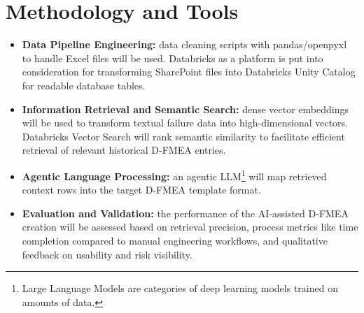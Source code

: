 
\section{Methodology and Tools}

\begin{itemize}
    \item \textbf{Data Pipeline Engineering:} data cleaning scripts with pandas/openpyxl to handle Excel files will be used. Databricks as a platform is put into consideration for transforming SharePoint files into Databricks Unity Catalog for readable database tables.
    \item \textbf{Information Retrieval and Semantic Search:} dense vector embeddings will be used to transform textual failure data into high-dimensional vectors. Databricks Vector Search will rank semantic similarity to facilitate efficient retrieval of relevant historical D-FMEA entries.
    \item \textbf{Agentic Language Processing:} an agentic LLM\footnote{Large Language Models are categories of deep learning models trained on amounts of data.} will map retrieved context rows into the target D-FMEA template format.
    \item \textbf{Evaluation and Validation:} the performance of the AI-assisted D-FMEA creation will be assessed based on retrieval precision, process metrics like time completion compared to manual engineering workflows, and qualitative feedback on usability and risk visibility.
\end{itemize}

